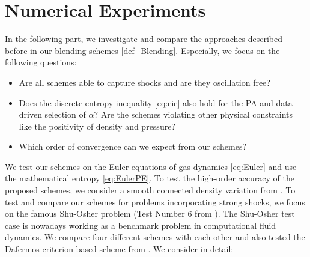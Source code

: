 \section{Numerical Experiments}\label{se_numerics}
In the following part, we investigate and compare the approaches described before in our blending schemes \ref{def_Blending}.  Especially, we
focus on the following questions: 
\begin{itemize}
	\item Are all schemes  able to capture shocks and are they oscillation free?
	\item Does the discrete entropy inequality \ref{eq:eie} also hold for the PA and data-driven selection of $\alpha$? Are the schemes violating other physical constraints like the positivity of density and pressure?
	\item Which order of convergence can we expect from our schemes?
\end{itemize}
We test our schemes on the Euler equations of gas dynamics  \eqref{eq:Euler}  and use the mathematical entropy   \eqref{eq:EulerPE}. To test the high-order accuracy of the proposed schemes, we consider a smooth connected density variation from  \cite{klein2021using}. To test and compare our schemes for problems incorporating
strong shocks, we focus on the famous Shu-Osher problem (Test Number 6 from  \cite{SO1988, SO1989}).
The Shu-Osher test case is nowadays working as  a benchmark problem in computational fluid dynamics. 
We compare four different schemes with each other and also tested the Dafermos criterion based scheme from \cite{klein2021using}. We consider in detail: %
